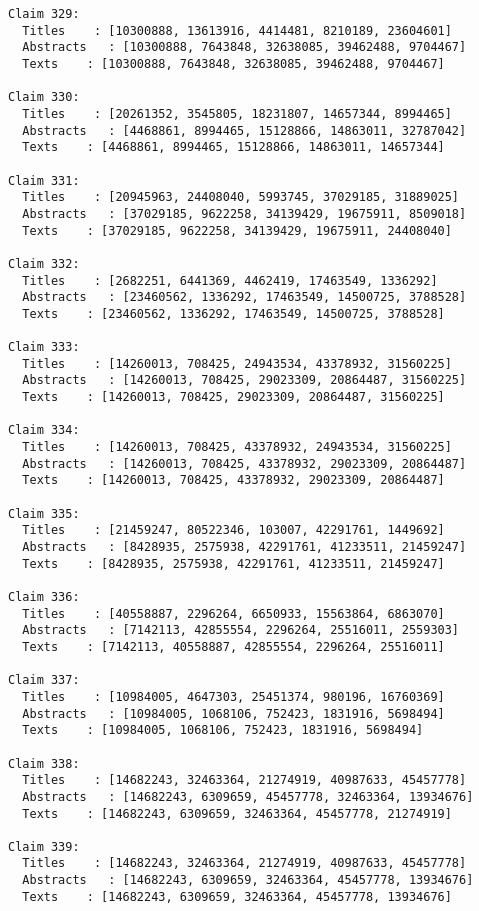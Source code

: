 \documentclass[11pt]{article}
\begin{document}
\begin{Verbatim}[commandchars=\\\{\}]
Claim 329:
  Titles    : [10300888, 13613916, 4414481, 8210189, 23604601]
  Abstracts   : [10300888, 7643848, 32638085, 39462488, 9704467]
  Texts    : [10300888, 7643848, 32638085, 39462488, 9704467]

Claim 330:
  Titles    : [20261352, 3545805, 18231807, 14657344, 8994465]
  Abstracts   : [4468861, 8994465, 15128866, 14863011, 32787042]
  Texts    : [4468861, 8994465, 15128866, 14863011, 14657344]

Claim 331:
  Titles    : [20945963, 24408040, 5993745, 37029185, 31889025]
  Abstracts   : [37029185, 9622258, 34139429, 19675911, 8509018]
  Texts    : [37029185, 9622258, 34139429, 19675911, 24408040]

Claim 332:
  Titles    : [2682251, 6441369, 4462419, 17463549, 1336292]
  Abstracts   : [23460562, 1336292, 17463549, 14500725, 3788528]
  Texts    : [23460562, 1336292, 17463549, 14500725, 3788528]

Claim 333:
  Titles    : [14260013, 708425, 24943534, 43378932, 31560225]
  Abstracts   : [14260013, 708425, 29023309, 20864487, 31560225]
  Texts    : [14260013, 708425, 29023309, 20864487, 31560225]

Claim 334:
  Titles    : [14260013, 708425, 43378932, 24943534, 31560225]
  Abstracts   : [14260013, 708425, 43378932, 29023309, 20864487]
  Texts    : [14260013, 708425, 43378932, 29023309, 20864487]

Claim 335:
  Titles    : [21459247, 80522346, 103007, 42291761, 1449692]
  Abstracts   : [8428935, 2575938, 42291761, 41233511, 21459247]
  Texts    : [8428935, 2575938, 42291761, 41233511, 21459247]

Claim 336:
  Titles    : [40558887, 2296264, 6650933, 15563864, 6863070]
  Abstracts   : [7142113, 42855554, 2296264, 25516011, 2559303]
  Texts    : [7142113, 40558887, 42855554, 2296264, 25516011]

Claim 337:
  Titles    : [10984005, 4647303, 25451374, 980196, 16760369]
  Abstracts   : [10984005, 1068106, 752423, 1831916, 5698494]
  Texts    : [10984005, 1068106, 752423, 1831916, 5698494]

Claim 338:
  Titles    : [14682243, 32463364, 21274919, 40987633, 45457778]
  Abstracts   : [14682243, 6309659, 45457778, 32463364, 13934676]
  Texts    : [14682243, 6309659, 32463364, 45457778, 21274919]

Claim 339:
  Titles    : [14682243, 32463364, 21274919, 40987633, 45457778]
  Abstracts   : [14682243, 6309659, 32463364, 45457778, 13934676]
  Texts    : [14682243, 6309659, 32463364, 45457778, 13934676]


\end{Verbatim}
\end{document}
